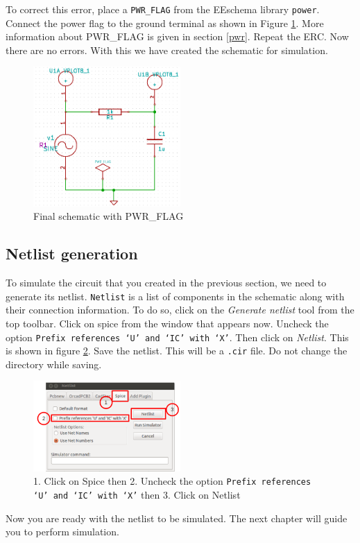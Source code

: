 To correct this error, place a {\tt PWR\_FLAG} from the EEschema library {\tt power}. Connect the power flag to the ground terminal as shown in Figure \ref{schemfin}. More information about PWR\_FLAG is given in section \ref{pwr}. Repeat the ERC. Now there are no errors. With this we have created the schematic for simulation.
\begin{figure}
\centering
\includegraphics[width=0.5\textwidth]{figures/schemfin}
\caption{Final schematic with PWR\_FLAG}
\label{schemfin}
\end{figure} 
\subsection{Netlist generation}
To simulate the circuit that you created in the previous section, we need to generate its netlist. {\tt Netlist} is a list of components in the schematic along with their connection information.  To do so, click on the \textit{Generate netlist} tool from the top toolbar. Click on spice from the window that appears now. Uncheck the option {\tt Prefix references `U' and `IC' with `X'}. Then click on \textit{Netlist}. This is shown in figure \ref{net}. Save the netlist. This will be a {\tt .cir} file. Do not change the directory while saving.
\begin{figure}
\centering
\includegraphics[width=0.5\textwidth]{figures/net}
\caption{1. Click on Spice then 2. Uncheck the option {\tt Prefix references `U' and `IC' with `X'} then 3. Click on Netlist }
\label{net}
\end{figure} 

Now you are ready with the netlist to be simulated. The next chapter will guide you to perform simulation.
%
